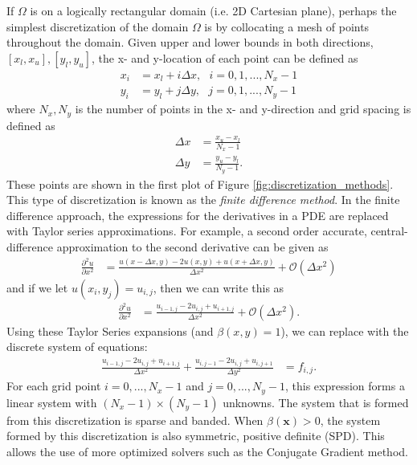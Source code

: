 If $\Omega$ is on a logically rectangular domain (i.e. 2D Cartesian plane), perhaps the simplest discretization of the domain $\Omega$ is by collocating a mesh of points throughout the domain. Given upper and lower bounds in both directions, $[x_l, x_u], [y_l, y_u]$, the x- and y-location of each point can be defined as
\begin{align}
    x_i &= x_l + i \Delta x,\ \ \ i = 0, 1, ..., N_x-1 \\
    y_i &= y_l + j \Delta y,\ \ \ j = 0, 1, ..., N_y-1
\end{align}
where $N_x, N_y$ is the number of points in the x- and y-direction and grid spacing is defined as
\begin{align}
    \Delta x &= \frac{x_u - x_l}{N_x - 1} \\
    \Delta y &= \frac{y_u - y_l}{N_y - 1}.
\end{align}
These points are shown in the first plot of Figure \ref{fig:discretization_methods}. This type of discretization is known as the {\em finite difference method}. In the finite difference approach, the expressions for the derivatives in a PDE are replaced with Taylor series approximations. For example, a second order accurate, central-difference approximation to the second derivative can be given as
\begin{align}
    \frac{\partial^2 u}{\partial x^2} &= \frac{u(x - \Delta x, y) - 2u(x, y) + u(x + \Delta x, y)}{\Delta x^2} + \mathcal{O}(\Delta x^2)
\end{align}
and if we let $u(x_i, y_j) = u_{i,j}$, then we can write this as
\begin{align}
    \frac{\partial^2 u}{\partial x^2} &= \frac{u_{i-1,j} - 2u_{i,j} + u_{i+1,j}}{\Delta x^2} + \mathcal{O}(\Delta x^2).
\end{align}
Using these Taylor Series expansions (and $\beta(x,y) = 1$), we can replace  with the discrete system of equations:
\begin{align}
    \frac{u_{i-1,j} - 2u_{i,j} + u_{i+1,j}}{\Delta x^2} + \frac{u_{i,j-1} - 2u_{i,j} + u_{i,j+1}}{\Delta y^2} &= f_{i,j}.
    \label{eq:poisson_FD}
\end{align}
For each grid point $i = 0, ..., N_x - 1$ and $j = 0, ..., N_y - 1$, this expression forms a linear system with $(N_x-1) \times (N_y-1)$ unknowns. The system that is formed from this discretization is sparse and banded. When $\beta(\textbf{x}) > 0$, the system formed by this discretization is also symmetric, positive definite (SPD). This allows the use of more optimized solvers such as the Conjugate Gradient method.


